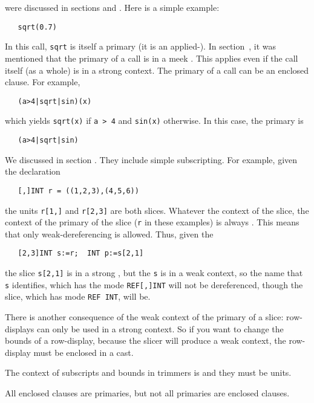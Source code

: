  were discussed in sections
 and . Here is a simple example:
\begin{verbatim}
   sqrt(0.7)
\end{verbatim}
\noindent
In this call, \verb|sqrt| is itself a primary (it is an
applied-). In
section~, it was mentioned that the primary of a
call is in a meek . This applies even if
the call itself (as a whole) is in a strong context. The primary of a
call can be an enclosed clause. For example,
\begin{verbatim}
   (a>4|sqrt|sin)(x)
\end{verbatim}
\noindent
which yields \verb|sqrt(x)| if \verb|a > 4| and \verb|sin(x)|
otherwise. In this case, the primary is
\begin{verbatim}
   (a>4|sqrt|sin)
\end{verbatim}

We discussed  in section . They
include simple subscripting.  For example, given the declaration
\begin{verbatim}
   [,]INT r = ((1,2,3),(4,5,6))
\end{verbatim}
\noindent
the units \verb|r[1,]| and \verb|r[2,3]| are both slices. Whatever the
context of the slice, the context of the primary of the slice (\verb|r|
in these examples) is always . This means that
only weak-dereferencing is allowed. Thus, given the
\begin{verbatim}
   [2,3]INT s:=r;  INT p:=s[2,1]
\end{verbatim}
\noindent
the slice \verb|s[2,1]| is in a strong ,
but the \verb|s| is in a weak context, so the name that \verb|s|
identifies, which has the mode \verb|REF[,]INT| will not be
dereferenced, though the slice, which has mode \verb|REF INT|, will
be.

\hypertarget{gram-slice}{}\label{gram-slice}%
There is another consequence of the weak context of the primary of a
slice: row-displays can only be used in a strong context. So if you
want to change the bounds of a row-display, because the slicer will
produce a weak context, the row-display must be enclosed in a cast.

The context of subscripts and bounds in trimmers is
 and they must be units.

All enclosed clauses are primaries, but not all primaries are
enclosed clauses.

